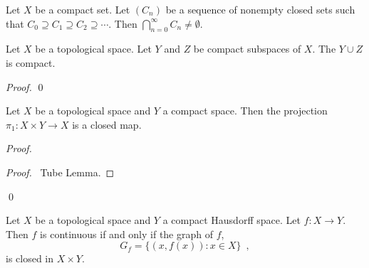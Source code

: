 \begin{cor}
Let $X$ be a compact set. Let $(C_n)$ be a sequence of nonempty  closed sets such that $C_0 \supseteq C_1 \supseteq C_2 \supseteq \cdots$. Then $\bigcap_{n=0}^\infty C_n \neq \emptyset$.
\end{cor}

\begin{prop}
Let $X$ be a topological space. Let $Y$ and $Z$ be compact subspaces of $X$. The $Y \cup Z$ is compact.
\end{prop}

\begin{proof}
\pf
{}
\qed
\end{proof}

\begin{prop}
\label{prop:projection_closed}
Let $X$ be a topological space and $Y$ a compact space. Then the projection $\pi_1 : X \times Y \rightarrow X$ is a closed map.
\end{prop}

\begin{proof}
\pf
{}
\begin{proof}
	\pf\ Tube Lemma.
\end{proof}
\qed
\end{proof}

\begin{thm}
Let $X$ be a topological space and $Y$ a compact Hausdorff space. Let $f : X \rightarrow Y$. Then $f$ is continuous if and only if the graph of $f$,
\[ G_f = \{ (x, f(x)) : x \in X \} \enspace , \]
is closed in $X \times Y$.
\end{thm}

